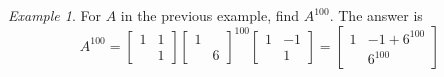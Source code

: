 \documentclass[11pt,oneside]{amsbook}
\theoremstyle{definition}
\theoremstyle{plain}
\theoremstyle{definition}
\theoremstyle{remark}
\newtheorem{example}[theorem]{Example}
\numberwithin{equation}{section}
\numberwithin{figure}{section}
\begin{document}
\begin{example}
  For $A$ in the previous example, find $A^{100}$. The answer is
  \[A^{100}=\begin{bmatrix}1&1\\&1\end{bmatrix}
    \begin{bmatrix}1&\\&6\end{bmatrix}^{100}
    \begin{bmatrix}1&-1\\&1\end{bmatrix}
    =\begin{bmatrix}1&-1+6^{100}\\&6^{100}\end{bmatrix}
  \]
\end{example}
\end{document}
